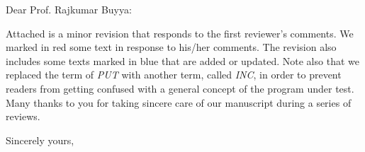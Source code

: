 \documentclass{letter} %
\begin{document}
\begin{letter}
\vspace{0.5in}
 
\opening{Dear Prof. Rajkumar Buyya:} 
 
\noindent 

Attached is a minor revision that responds to the first reviewer's comments. 
We marked in red some text in response to his/her comments. 
The revision also includes some texts marked in blue that are added or updated. 
Note also that we replaced the term of {\em PUT} with another term, called {\em INC}, 
in order to prevent readers from getting confused with a general concept of the program under test. 
Many thanks to you for taking sincere care of our manuscript during a series of reviews.

\closing{Sincerely yours,} 

\end{letter}
 
\end{document}
